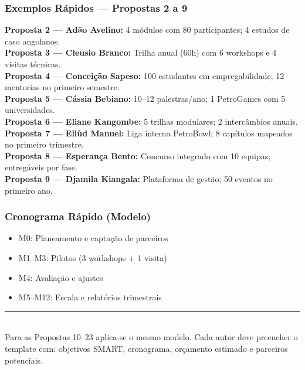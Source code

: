 \documentclass[12pt,a4paper]{article}
\begin{document}
\subsubsection*{Exemplos Rápidos — Propostas 2 a 9}

\textbf{Proposta 2 — Adão Avelino:} 4 módulos com 80 participantes; 4 estudos de caso angolanos.\\[2pt]
\textbf{Proposta 3 — Cleusio Branco:} Trilha anual (60h) com 6 workshops e 4 visitas técnicas.\\[2pt]
\textbf{Proposta 4 — Conceição Sapeso:} 100 estudantes em empregabilidade; 12 mentorias no primeiro semestre.\\[2pt]
\textbf{Proposta 5 — Cássia Bebiano:} 10–12 palestras/ano; 1 PetroGames com 5 universidades.\\[2pt]
\textbf{Proposta 6 — Eliane Kangombe:} 5 trilhas modulares; 2 intercâmbios anuais.\\[2pt]
\textbf{Proposta 7 — Eliùd Manuel:} Liga interna PetroBowl; 8 capítulos mapeados no primeiro trimestre.\\[2pt]
\textbf{Proposta 8 — Esperança Bento:} Concurso integrado com 10 equipas; entregáveis por fase.\\[2pt]
\textbf{Proposta 9 — Djamila Kiangala:} Plataforma de gestão; 50 eventos no primeiro ano.

\subsubsection*{Cronograma Rápido (Modelo)}
\begin{itemize}
    \item M0: Planeamento e captação de parceiros
    \item M1–M3: Pilotos (3 workshops + 1 visita)
    \item M4: Avaliação e ajustes
    \item M5–M12: Escala e relatórios trimestrais
\end{itemize}

\vspace{0.5cm}
\begin{center}
{\color{gold}\rule{10cm}{0.6pt}}\\[4pt]
{\small\color{muted} Para as Propostas 10–23 aplica-se o mesmo modelo. Cada autor deve preencher o template com: objetivos SMART, cronograma, orçamento estimado e parceiros potenciais.}
\end{center}
\end{document}
